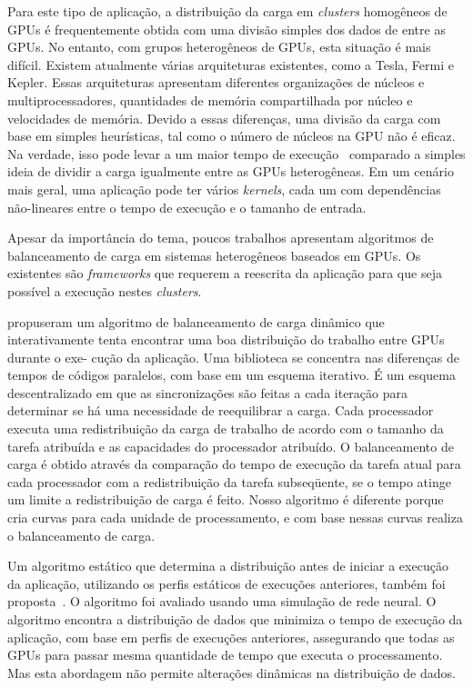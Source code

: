 Para este tipo de aplicação, a distribuição da carga em \emph{clusters}
homogêneos de GPUs é frequentemente obtida com uma divisão simples dos dados de
entre as GPUs. No entanto, com grupos heterogêneos de GPUs, esta situação é mais
difícil. Existem atualmente várias arquiteturas existentes, como a Tesla, Fermi
e Kepler. Essas arquiteturas apresentam diferentes organizações de núcleos e
multiprocessadores, quantidades de memória compartilhada por núcleo e
velocidades de memória. Devido a essas diferenças, uma divisão da carga com base
em simples heurísticas, tal como o número de núcleos na GPU não é eficaz. Na
verdade, isso pode levar a um maior tempo de execução~\citep{raphael} comparado a
simples ideia de dividir a carga igualmente entre as GPUs heterogêneas. Em um
cenário mais geral, uma aplicação pode ter vários \emph{kernels}, cada um com
dependências não-lineares entre o tempo de execução e o tamanho de entrada.

Apesar da importância do tema, poucos trabalhos apresentam algoritmos de
balanceamento de carga em sistemas heterogêneos baseados em GPUs. Os existentes
são \emph{frameworks} que requerem a reescrita da aplicação para que seja
possível a execução nestes \emph{clusters}.

\citep{acosta} propuseram um algoritmo de balanceamento de carga dinâmico que interativamente tenta encontrar uma boa distribuição do trabalho entre GPUs durante o exe- cução da aplicação. Uma biblioteca se concentra nas diferenças de tempos de códigos paralelos, com base em um esquema iterativo. É um esquema descentralizado em que as sincronizações são feitas a cada iteração para determinar se há uma necessidade de reequilibrar a carga. Cada processador executa uma redistribuição da carga de trabalho de acordo com o tamanho da tarefa atribuída e as capacidades do processador atribuído. O balanceamento de carga é obtido através da comparação do tempo de execução da tarefa atual para cada processador com a redistribuição da tarefa subseqüente, se o tempo atinge um limite a redistribuição de carga é feito. Nosso algoritmo é diferente porque cria curvas para cada unidade de processamento, e com base nessas curvas realiza o balanceamento de carga. 

Um algoritmo estático que determina a distribuição antes de iniciar a execução da aplicação, utilizando os perfis estáticos de execuções anteriores, também foi proposta~\citep{raphael}. O algoritmo foi avaliado usando uma simulação de rede neural. O algoritmo encontra a distribuição de dados que minimiza o tempo de execução da aplicação, com base em perfis de execuções anteriores, assegurando que todas as GPUs para passar mesma quantidade de tempo que executa o processamento. Mas esta abordagem não permite alterações dinâmicas na distribuição de dados. 

